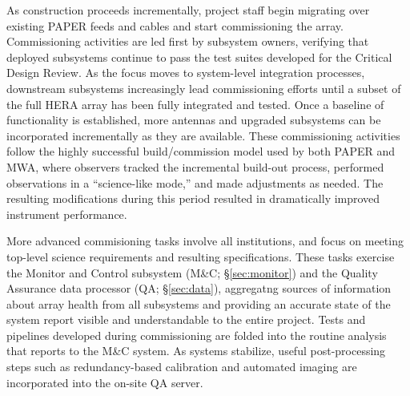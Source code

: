 \documentclass[preprint]{aastex}
\begin{document}
As construction proceeds incrementally, project staff begin migrating over existing PAPER feeds and cables 
and start commissioning the array.  
Commissioning activities are led first by subsystem owners, verifying that deployed subsystems 
continue to pass the test suites developed for the Critical Design Review.
As the focus moves to system-level integration processes, downstream subsystems increasingly
lead commissioning efforts until a subset of the full HERA
array has been fully integrated and tested.  Once a baseline of functionality is established,
more antennas and upgraded subsystems can be incorporated incrementally as they are available.
These commissioning activities follow the highly successful
build/commission model used by both PAPER and MWA, %
where observers tracked the incremental build-out
process, performed observations in a ``science-like mode,'' and made
adjustments as needed. The resulting modifications during this period resulted
in dramatically improved instrument performance.  

More advanced commisioning tasks involve all institutions, and
focus on meeting top-level science requirements
and resulting specifications.  %
These tasks exercise the Monitor and Control subsystem (M\&C; \S\ref{sec:monitor})
and the Quality Assurance data processor (QA; \S\ref{sec:data}), 
aggregatng sources of
information about array health from all subsystems and providing an accurate
state of the system report visible and understandable to the entire project.
Tests and pipelines developed during commissioning are folded into
the routine analysis that reports to the M\&C system.  As systems stabilize,
useful post-processing steps such as redundancy-based calibration and automated
imaging are incorporated into the on-site QA server.

\end{document}
